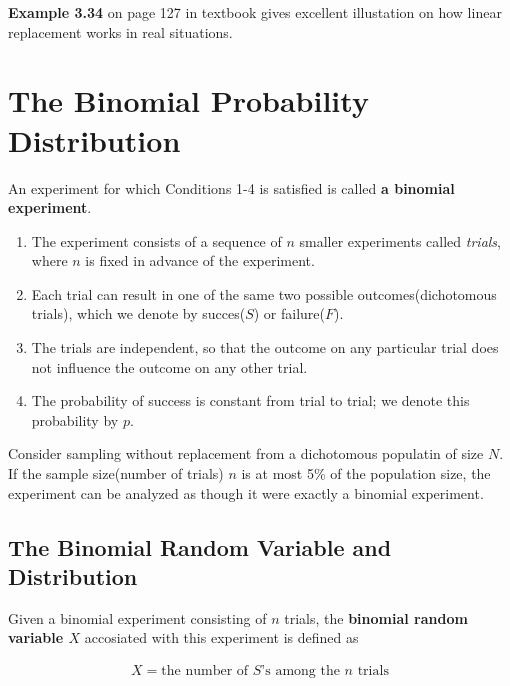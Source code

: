 \textbf{Example 3.34} on page 127 in textbook gives excellent illustation on how linear replacement works in real situations.

\section{The Binomial Probability Distribution}

\begin{definition}
    An experiment for which Conditions 1-4 is satisfied is called \textbf{a binomial experiment}.

    \begin{enumerate}
        \item The experiment consists of a sequence of $n$ smaller experiments called \textit{trials}, where $n$ is fixed in advance of the experiment.
        \item Each trial can result in one of the same two possible outcomes(dichotomous trials), which we denote by succes($S$) or failure($F$).
        \item The trials are independent, so that the outcome on any particular trial does not influence the outcome on any other trial.
        \item The probability of success is constant from trial to trial; we denote this probability by $p$.
    \end{enumerate}
\end{definition}

\begin{proposition}
    Consider sampling without replacement from a dichotomous populatin of size $N$. If the sample size(number of trials) $n$ is at most 5\% of the population size, the experiment can be analyzed as though it were exactly a binomial experiment.
\end{proposition}

\subsection{The Binomial Random Variable and Distribution}

\begin{definition}
    Given a binomial experiment consisting of $n$ trials, the \textbf{binomial random variable $X$} accosiated with this experiment is defined as 

    \begin{align*}
        X = \text{the number of }S\text{'s among the }n\text{ trials} \\
    \end{align*}
\end{definition}

